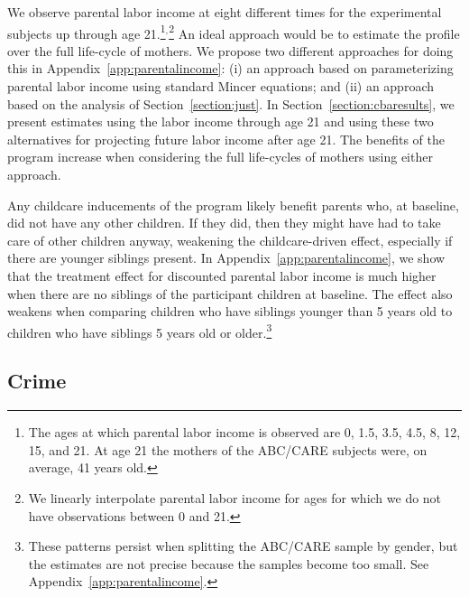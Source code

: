 We observe parental labor income at eight different times for the experimental subjects up through age 21.\footnote{The ages at which parental labor income is observed are 0, 1.5, 3.5, 4.5, 8, 12, 15, and 21. At age 21 the mothers of the ABC/CARE subjects were, on average, 41 years old.}$^,$\footnote{We linearly interpolate parental labor income for ages for which we do not have observations between 0 and 21.} An ideal approach would be to estimate the profile over the full life-cycle of mothers. We propose two different approaches for doing this in Appendix~\ref{app:parentalincome}: (i) an approach based on parameterizing parental labor income using standard Mincer equations; and (ii) an approach based on the analysis of Section~\ref{section:just}. In Section~\ref{section:cbaresults}, we present estimates using the labor income through age 21 and using these two alternatives for projecting future labor income after age 21. The benefits of the program increase when considering the full life-cycles of mothers using either approach.

Any childcare inducements of the program likely benefit parents who, at baseline, did not have any other children. If they did, then they might have had to take care of other children anyway, weakening the childcare-driven effect, especially if there are younger siblings present. In Appendix~\ref{app:parentalincome}, we show that the treatment effect for discounted parental labor income is much higher when there are no siblings of the participant children at baseline. The effect also weakens when comparing children who have siblings younger than 5 years old to children who have siblings 5 years old or older.\footnote{These patterns persist when splitting the ABC/CARE sample by gender, but the estimates are not precise because the samples become too small. See Appendix~\ref{app:parentalincome}.}

\subsection{Crime}\label{sec:crime}

